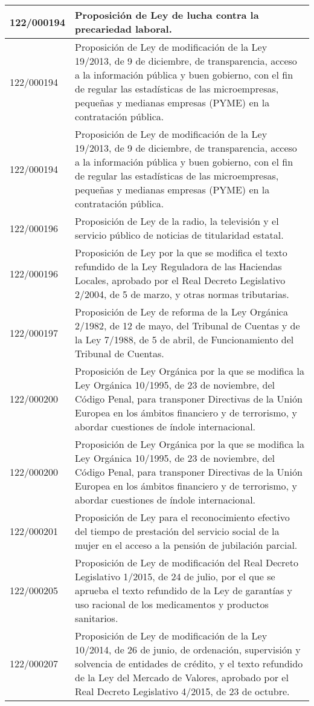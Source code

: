 {\begin{table}[H]
\begin{center}
\begin{tabularx}{\linewidth}{| l | X |}
\hline
122/000194 & Proposición de Ley de lucha contra la precariedad laboral. \\
\hline
122/000194 & Proposición de Ley de modificación de la Ley 19/2013, de 9 de diciembre, de transparencia, acceso a la información pública y buen gobierno, con el fin de regular las estadísticas de las microempresas, pequeñas y medianas empresas (PYME) en la contratación pública. \\
\hline
122/000194 & Proposición de Ley de modificación de la Ley 19/2013, de 9 de diciembre, de transparencia, acceso a la información pública y buen gobierno, con el fin de regular las estadísticas de las microempresas, pequeñas y medianas empresas (PYME) en la contratación pública. \\
\hline
122/000196 & Proposición de Ley de la radio, la televisión y el servicio público de noticias de titularidad estatal. \\
\hline
122/000196 & Proposición de Ley por la que se modifica el texto refundido de la Ley Reguladora de las Haciendas Locales, aprobado por el Real Decreto Legislativo 2/2004, de 5 de marzo, y otras normas tributarias. \\
\hline
122/000197 & Proposición de Ley de reforma de la Ley Orgánica 2/1982, de 12 de mayo, del Tribunal de Cuentas y de la Ley 7/1988, de 5 de abril, de Funcionamiento del Tribunal de Cuentas. \\
\hline
122/000200 & Proposición de Ley Orgánica por la que se modifica la Ley Orgánica 10/1995, de 23 de noviembre, del Código Penal, para transponer Directivas de la Unión Europea en los ámbitos financiero y de terrorismo, y abordar cuestiones de índole internacional. \\
\hline
122/000200 & Proposición de Ley Orgánica por la que se modifica la Ley Orgánica 10/1995, de 23 de noviembre, del Código Penal, para transponer Directivas de la Unión Europea en los ámbitos financiero y de terrorismo, y abordar cuestiones de índole internacional. \\
\hline
122/000201 & Proposición de Ley para el reconocimiento efectivo del tiempo de prestación del servicio social de la mujer en el acceso a la pensión de jubilación parcial. \\
\hline
122/000205 & Proposición de Ley de modificación del Real Decreto Legislativo 1/2015, de 24 de julio, por el que se aprueba el texto refundido de la Ley de garantías y uso racional de los medicamentos y productos sanitarios. \\
\hline
122/000207 & Proposición de Ley de modificación de la Ley 10/2014, de 26 de junio, de ordenación, supervisión y solvencia de entidades de crédito, y el texto refundido de la Ley del Mercado de Valores, aprobado por el Real Decreto Legislativo 4/2015, de 23 de octubre. \\

\end{tabularx}
\end{center}
\end{table}}
